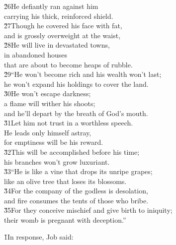 \begin{poetry}
\poeml \v{26}He defiantly ran against him \\
\poemll    carrying his thick, reinforced shield. \\
\poeml \v{27}Though he covered his face with fat, \\
\poemll    and is grossly overweight at the waist, \\
\poeml \v{28}He will live in devastated towns, \\
\poemll    in abandoned houses \\
\poemlll       that are about to become heaps of rubble. \\
\poeml \v{29}``He won't become rich and his wealth won't last; \\
\poemll    he won't expand his holdings to cover the land. \\
\poeml \v{30}He won't escape darkness; \\
\poemll    a flame will wither his shoots; \\
\poemlll       and he'll depart by the breath of God's mouth. \\
\poeml \v{31}Let him not trust in a worthless speech. \\
\poemll    He leads only himself astray, \\
\poemlll       for emptiness will be his reward. \\
\poeml \v{32}This will be accomplished before his time; \\
\poemll    his branches won't grow luxuriant. \\
\poeml \v{33}``He is like a vine that drops its unripe grapes; \\
\poemll    like an olive tree that loses its blossoms. \\
\poeml \v{34}For the company of the godless is desolation, \\
\poemll    and fire consumes the tents of those who bribe. \\
\poeml \v{35}For they conceive mischief and give birth to iniquity; \\
\poemll    their womb is pregnant with deception.''
\end{poetry}

\v{1}In response, Job said:

